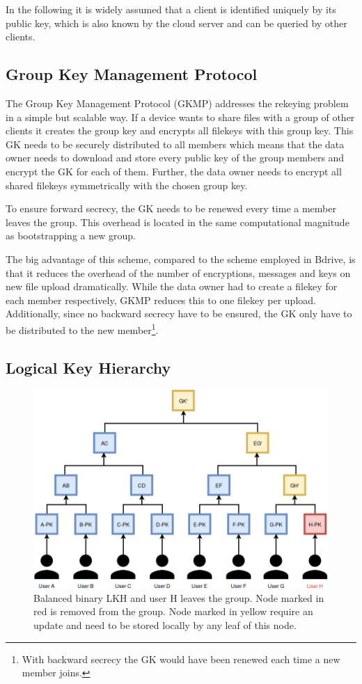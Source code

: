 In the following it is widely assumed that a client is identified uniquely by its public key, which is also known by the cloud server and can be queried by other clients. 

\subsection{Group Key Management Protocol}
The Group Key Management Protocol (\ac{GKMP}) \cite{harney1997group} addresses the rekeying problem in a simple but scalable way. If a device wants to share files with a group of other clients it creates the group key and encrypts all filekeys with this group key. This \ac{GK} needs to be securely distributed to all members which means that the data owner needs to download and store every public key of the group members and encrypt the \ac{GK} for each of them. Further, the data owner needs to encrypt all shared filekeys symmetrically with the chosen group key. 

To ensure forward secrecy, the \ac{GK} needs to be renewed every time a member leaves the group. This overhead is located in the same computational magnitude as bootstrapping a new group. 

The big advantage of this scheme, compared to the scheme employed in Bdrive, is that it reduces the overhead of the number of encryptions, messages and keys on new file upload dramatically. While the data owner had to create a filekey for each member respectively, \ac{GKMP} reduces this to one filekey per upload. Additionally, since no backward secrecy have to be ensured, the \ac{GK} only have to be distributed to the new member\footnote{With backward secrecy the GK would have been renewed each time a new member joins.}.

\subsection{Logical Key Hierarchy}
\begin{figure}[!ht]
\centering
    \includegraphics[width=0.8\linewidth]{img/LKH.png}
    \caption{Balanced binary \ac{LKH} and user H leaves the group. Node marked in red is removed from the group. Node marked in yellow require an update and need to be stored locally by any leaf of this node. }
    \label{fig:lkh}
\end{figure}

